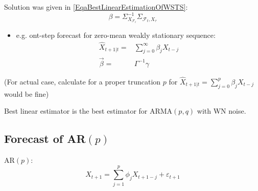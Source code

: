     Solution was given in \autoref{EqaBestLinearEstimationOfWSTS}:
    \begin{equation}
        \beta =\Sigma _{X_{\mathscr{F}_t}}^{-1}\Sigma _{\mathscr{F}_t,X_{\tau}}
    \end{equation}

    \begin{itemize}[topsep=2pt,itemsep=0pt]
        \item e.g. ont-step forecast for zero-mean weakly stationary sequence:
    \begin{align}
        \hat{X}_{t+1|t}=&\sum_{j=0}^\infty \beta _jX_{t-j}\\
        \vec{\beta }=&\Gamma^{-1}\gamma 
    \end{align}
    \end{itemize}
    
    (For actual case, calculate for a proper truncation $ p $ for $ \hat{X}_{t+1|t}=\sum_{j=0}^p\beta _jX_{t-j} $ would be fine)
        
    

    Best linear estimator is the best estimator for ARMA$ (p,q) $ with WN noise.


    
    
\subsection{Forecast of AR$ (p) $}
    AR$ (p) $:
    \begin{equation}
        X_{t+1}=\sum_{j=1}^p\phi _jX_{t+1-j}+\varepsilon _{t+1}
    \end{equation}
    
